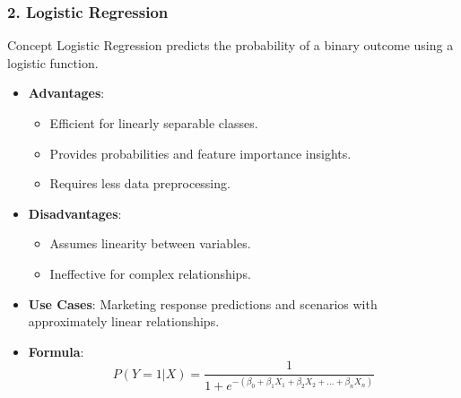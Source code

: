 \documentclass[aspectratio=169]{beamer}
\begin{document}
\begin{frame}[fragile]
    \frametitle{2. Logistic Regression}
    \begin{block}{Concept}
        Logistic Regression predicts the probability of a binary outcome using a logistic function.
    \end{block}
    \begin{itemize}
        \item \textbf{Advantages}:
            \begin{itemize}
                \item Efficient for linearly separable classes.
                \item Provides probabilities and feature importance insights.
                \item Requires less data preprocessing.
            \end{itemize}
        \item \textbf{Disadvantages}:
            \begin{itemize}
                \item Assumes linearity between variables.
                \item Ineffective for complex relationships.
            \end{itemize}
        \item \textbf{Use Cases}: Marketing response predictions and scenarios with approximately linear relationships.
        \item \textbf{Formula}:
        \begin{equation}
            P(Y=1|X) = \frac{1}{1 + e^{-(\beta_0 + \beta_1X_1 + \beta_2X_2 + ... + \beta_nX_n)}}
        \end{equation}
    \end{itemize}
\end{frame}
\end{document}
